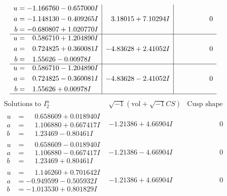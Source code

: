 \documentclass[1p]{elsarticle_modified}
\theoremstyle{definition}
\newcommand{\I}{\sqrt{-1}}
\begin{document}
$$\begin{array}{c|c|c}
\begin{aligned}
u &= -1.166760 - 0.657000 I \\
a &= -1.148130 - 0.409265 I \\
b &= -0.680807 + 1.020770 I\end{aligned}
 & \phantom{-}3.18015 + 7.10294 I & \phantom{-0.000000 } 0 \\ \hline\begin{aligned}
u &= \phantom{-}0.586710 + 1.204890 I \\
a &= \phantom{-}0.724825 + 0.360081 I \\
b &= \phantom{-}1.55626 - 0.00978 I\end{aligned}
 & -4.83628 + 2.41052 I & \phantom{-0.000000 } 0 \\ \hline\begin{aligned}
u &= \phantom{-}0.586710 - 1.204890 I \\
a &= \phantom{-}0.724825 - 0.360081 I \\
b &= \phantom{-}1.55626 + 0.00978 I\end{aligned}
 & -4.83628 - 2.41052 I & \phantom{-0.000000 } 0\\
 \hline 
 \end{array}$$\newpage$$\begin{array}{c|c|c}  
\text{Solutions to }I^u_{2}& \I (\text{vol} + \sqrt{-1}CS) & \text{Cusp shape}\\
 \hline 
\begin{aligned}
u &= \phantom{-}0.658609 + 0.018940 I \\
a &= \phantom{-}1.106880 + 0.667417 I \\
b &= \phantom{-}1.23469 - 0.80461 I\end{aligned}
 & -1.21386 + 4.66904 I & \phantom{-0.000000 } 0 \\ \hline\begin{aligned}
u &= \phantom{-}0.658609 - 0.018940 I \\
a &= \phantom{-}1.106880 - 0.667417 I \\
b &= \phantom{-}1.23469 + 0.80461 I\end{aligned}
 & -1.21386 - 4.66904 I & \phantom{-0.000000 } 0 \\ \hline\begin{aligned}
u &= \phantom{-}1.146260 + 0.701642 I \\
a &= -0.949599 - 0.505932 I \\
b &= -1.013530 + 0.801829 I\end{aligned}
 & -1.21386 + 4.66904 I & \phantom{-0.000000 } 0 \\ \hline\begin{aligned}

\end{aligned}
\end{array}$$
\end{document}
